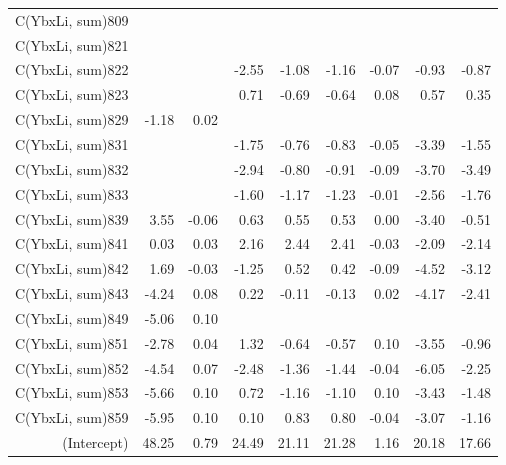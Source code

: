 \begin{table}[p]
\begin{tabular}{rrrrrrrrr}
  C(YbxLi, sum)809 &  &  &  &  &  &  &  &  \\ 
  C(YbxLi, sum)821 &  &  &  &  &  &  &  &  \\ 
  C(YbxLi, sum)822 &  &  & -2.55 & -1.08 & -1.16 & -0.07 & -0.93 & -0.87 \\ 
  C(YbxLi, sum)823 &  &  & 0.71 & -0.69 & -0.64 & 0.08 & 0.57 & 0.35 \\ 
  C(YbxLi, sum)829 & -1.18 & 0.02 &  &  &  &  &  &  \\ 
  C(YbxLi, sum)831 &  &  & -1.75 & -0.76 & -0.83 & -0.05 & -3.39 & -1.55 \\ 
  C(YbxLi, sum)832 &  &  & -2.94 & -0.80 & -0.91 & -0.09 & -3.70 & -3.49 \\ 
  C(YbxLi, sum)833 &  &  & -1.60 & -1.17 & -1.23 & -0.01 & -2.56 & -1.76 \\ 
  C(YbxLi, sum)839 & 3.55 & -0.06 & 0.63 & 0.55 & 0.53 & 0.00 & -3.40 & -0.51 \\ 
  C(YbxLi, sum)841 & 0.03 & 0.03 & 2.16 & 2.44 & 2.41 & -0.03 & -2.09 & -2.14 \\ 
  C(YbxLi, sum)842 & 1.69 & -0.03 & -1.25 & 0.52 & 0.42 & -0.09 & -4.52 & -3.12 \\ 
  C(YbxLi, sum)843 & -4.24 & 0.08 & 0.22 & -0.11 & -0.13 & 0.02 & -4.17 & -2.41 \\ 
  C(YbxLi, sum)849 & -5.06 & 0.10 &  &  &  &  &  &  \\ 
  C(YbxLi, sum)851 & -2.78 & 0.04 & 1.32 & -0.64 & -0.57 & 0.10 & -3.55 & -0.96 \\ 
  C(YbxLi, sum)852 & -4.54 & 0.07 & -2.48 & -1.36 & -1.44 & -0.04 & -6.05 & -2.25 \\ 
  C(YbxLi, sum)853 & -5.66 & 0.10 & 0.72 & -1.16 & -1.10 & 0.10 & -3.43 & -1.48 \\ 
  C(YbxLi, sum)859 & -5.95 & 0.10 & 0.10 & 0.83 & 0.80 & -0.04 & -3.07 & -1.16 \\ 
  (Intercept) & 48.25 & 0.79 & 24.49 & 21.11 & 21.28 & 1.16 & 20.18 & 17.66 \\ 
   \hline
\end{tabular}
\end{table}
